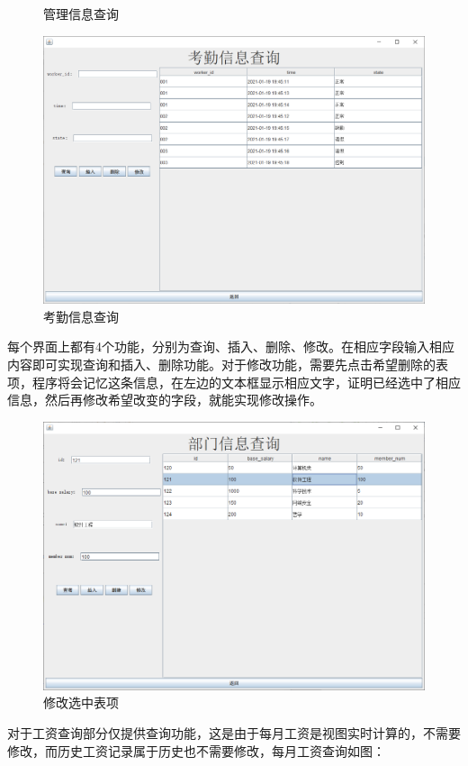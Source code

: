 \documentclass[withoutpreface,bwprint]{cumcmthesis} %
\begin{document}
\begin{figure}[H]
\begin{minipage}[t]{0.49\linewidth}
		\caption{管理信息查询}
	\end{minipage}
\begin{minipage}[t]{0.49\linewidth}
		\centering
		\includegraphics[width=1\linewidth]{attendence}
		\caption{考勤信息查询}
	\end{minipage}
\end{figure}

每个界面上都有4个功能，分别为查询、插入、删除、修改。在相应字段输入相应内容即可实现查询和插入、删除功能。对于修改功能，需要先点击希望删除的表项，程序将会记忆这条信息，在左边的文本框显示相应文字，证明已经选中了相应信息，然后再修改希望改变的字段，就能实现修改操作。
\begin{figure}[H]
    \centering
    \includegraphics[width=0.8\linewidth]{change}
    \caption{修改选中表项}
\end{figure}
对于工资查询部分仅提供查询功能，这是由于每月工资是视图实时计算的，不需要修改，而历史工资记录属于历史也不需要修改，每月工资查询如图：
\end{document}
